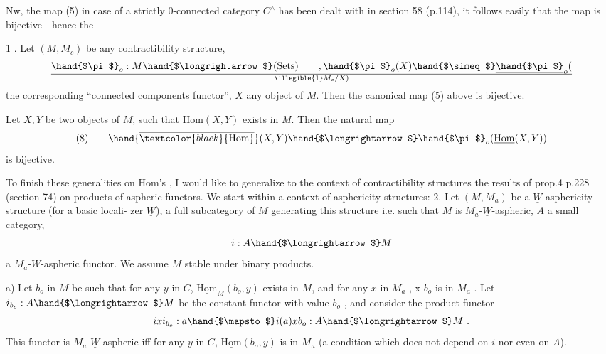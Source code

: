 
 Nw,  the map (5) in case of a strictly  0-connected category
\hand{(}$C^{\wedge}$\hand{)} has been dealt with in section 58 (p.114), it follows easily that the
map is bijective - hence the

\hand{\uline{\textcolor{black}{Proposition}}} 1 . Let $(M,M_c)$ be any contractibility structure, 
\[ \hand{$\pi$}_o : M \hand{$\longrightarrow$} \text{(Sets)} \qquad , \hand{$\pi$}_o(X) \hand{$\simeq$} \underline{\hand{$\pi$}}_o(\over{\illegible{1}}{M_c}/X) \] 
the corresponding ``connected components functor'', $X$ any object of $M$. Then
the canonical map (5) above is bijective.

\hand{\uline{\textcolor{black}{Corollary}}} Let $X,Y$ be two objects of $M$, such that $\underline{\mathrm{Hom}}(X,Y)$ exists in $M$.
Then the natural map
\[ (8) \qquad \hand{\overline{\textcolor{black}{\mathrm{Hom}}}}(X,Y) \hand{$\longrightarrow$} \hand{$\pi$}_o(\underline{\mathrm{Hom}}(X,Y)) \]
is bijective. \margin{$\lfloor$\rule{3cm}{0.4pt}}

\margin{$\ulcorner$\rule{3cm}{0.4pt}} To finish these generalities on $\underline{\mathrm{Hom}}$'s , I would like to generalize
to the context of contractibility structures the results of prop.4 p.228
(section 74) on products of aspheric functors. We start within a context
of asphericity structures:
\hand{\uline{\textcolor{black}{Proposition}}} 2. Let $(M,M_a)$ be a $\underline{W}$-asphericity structure (for a basic locali-%
zer $\underline{W}$),  a full subcategory of $M$ generating this structure i.e. such that
 \hand{$\to$} $M$ is $M_a$-$\underline{W}$-aspheric, $A$ a small category,
\[ i: A \hand{$\longrightarrow$} M \]
a  $M_a$-$\underline{W}$-aspheric functor. We assume $M$ stable under binary products.

a) Let $b_o$ in $M$ be such that for any $y$ in $C$, $\underline{\mathrm{Hom}}_M(b_o,y)$ exists in $M$,
and for any $x$ in $M_a$ ,  x $b_o$ is in $M_a$ . Let $i_{b_o} : A \hand{$\longrightarrow$} M$ be the constant
functor with value $b_o$ , and consider the product functor
\[ ixi_{b_o} : a \hand{$\mapsto$} i(a)xb_o : A \hand{$\longrightarrow$} M \ . \]
This functor is $M_a$-$\underline{W}$-aspheric iff for any $y$ in $C$, $\underline{\mathrm{Hom}}(b_o,y)$ is in $M_a$
(a condition which does not depend on $i$ nor even on $A$).

